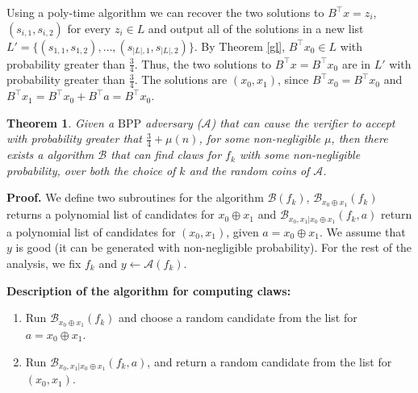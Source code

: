 \documentclass{article}
\newtheorem{thm}{Theorem}
\begin{document}
Using a poly-time algorithm we can recover the two solutions to $B^{\top}x = z_{i}$, $(s_{i,1}, s_{i,2})$ for every $z_{i}\in L$ and output all of the solutions in a new list $L'=\{(s_{1,1}, s_{1,2}),\dots,(s_{|L|,1},s_{|L|,2})\}$. By Theorem \ref{gl}, $B^{\top}x_{0}\in L$ with probability greater than $\frac{3}{4}$. Thus, the two solutions to $B^{\top}x=B^{\top}x_{0}$ are in $L'$ with probability greater than $\frac{3}{4}$. The solutions are $(x_{0}, x_{1})$, since $B^{\top}x_{0}=B^{\top}x_{0}$ and $B^{\top}x_{1}=B^{\top}x_{0}+B^{\top}a=B^{\top}x_{0}$.

\begin{thm}
\label{findclaw}
Given a $\mathrm{BPP}$ adversary ($\mathcal{A}$) that can cause the verifier to accept with probability greater that $\frac{3}{4}+\mu(n)$, for some non-negligible $\mu$, then there exists a  algorithm $\mathcal{B}$ that can find claws for $f_{k}$ with some non-negligible probability, over both the choice of $k$ and the random coins of $\mathcal{A}$.
\end{thm}

\textbf{Proof.} We define two subroutines for the algorithm $\mathcal{B}(f_{k})$, $\mathcal{B}_{x_{0}\oplus x_{1}}(f_{k})$ returns a polynomial list of candidates for $x_{0}\oplus x_{1}$ and $\mathcal{B}_{x_{0}, x_{1}|x_{0}\oplus x_{1}}(f_{k}, a)$ return a polynomial list of candidates for $(x_{0}, x_{1})$, given $a=x_{0}\oplus x_{1}$. We assume that $y$ is good (it can be generated with non-negligible probability). For the rest of the analysis, we fix $f_{k}$ and $y\leftarrow \mathcal{A}(f_{k})$.

\textbf{Description of the algorithm for computing claws:}
\begin{enumerate}
    \item Run $\mathcal{B}_{x_{0}\oplus x_{1}}(f_{k})$ and choose a random candidate from the list for $a=x_{0}\oplus x_{1}$.
    \item Run $\mathcal{B}_{x_{0}, x_{1}|x_{0}\oplus x_{1}}(f_{k}, a)$, and return a random candidate from the list for $(x_{0},x_{1})$.
\end{enumerate}
\end{document}
